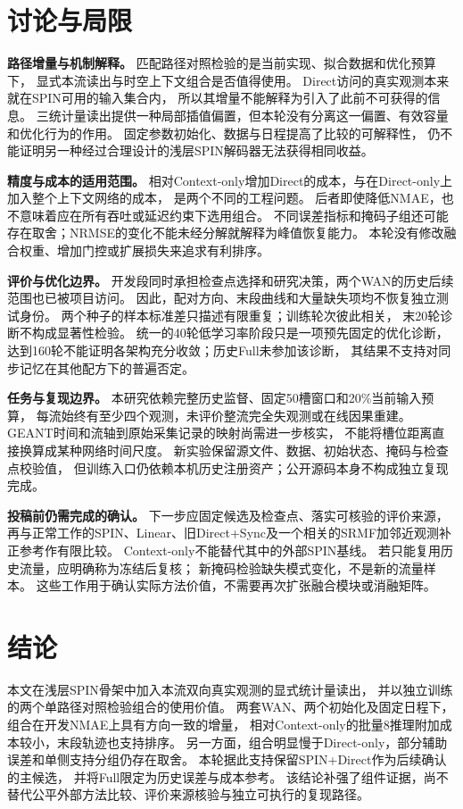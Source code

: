 \section{讨论与局限}
\label{sec:limitations}
\textbf{路径增量与机制解释。}
匹配路径对照检验的是当前实现、拟合数据和优化预算下，
显式本流读出与时空上下文组合是否值得使用。
Direct访问的真实观测本来就在SPIN可用的输入集合内，
所以其增量不能解释为引入了此前不可获得的信息。
三统计量读出提供一种局部插值偏置，但本轮没有分离这一偏置、有效容量和优化行为的作用。
固定参数初始化、数据与日程提高了比较的可解释性，
仍不能证明另一种经过合理设计的浅层SPIN解码器无法获得相同收益。

\textbf{精度与成本的适用范围。}
相对Context-only增加Direct的成本，与在Direct-only上加入整个上下文网络的成本，
是两个不同的工程问题。
后者即使降低NMAE，也不意味着应在所有吞吐或延迟约束下选用组合。
不同误差指标和掩码子组还可能存在取舍；NRMSE的变化不能未经分解就解释为峰值恢复能力。
本轮没有修改融合权重、增加门控或扩展损失来追求有利排序。

\textbf{评价与优化边界。}
开发段同时承担检查点选择和研究决策，两个WAN的历史后续范围也已被项目访问。
因此，配对方向、末段曲线和大量缺失项均不恢复独立测试身份。
两个种子的样本标准差只描述有限重复；训练轮次彼此相关，
末20轮诊断不构成显著性检验。
统一的40轮低学习率阶段只是一项预先固定的优化诊断，
达到160轮不能证明各架构充分收敛；历史Full未参加该诊断，
其结果不支持对同步记忆在其他配方下的普遍否定。

\textbf{任务与复现边界。}
本研究依赖完整历史监督、固定50槽窗口和20\%当前输入预算，
每流始终有至少四个观测，未评价整流完全失观测或在线因果重建。
GEANT时间和流轴到原始采集记录的映射尚需进一步核实，
不能将槽位距离直接换算成某种网络时间尺度。
新实验保留源文件、数据、初始状态、掩码与检查点校验值，
但训练入口仍依赖本机历史注册资产；公开源码本身不构成独立复现完成。

\textbf{投稿前仍需完成的确认。}
下一步应固定候选及检查点、落实可核验的评价来源，
再与正常工作的SPIN、Linear、旧Direct+Sync及一个相关的SRMF加邻近观测补正参考作有限比较。
Context-only不能替代其中的外部SPIN基线。
若只能复用历史流量，应明确称为冻结后复核；
新掩码检验缺失模式变化，不是新的流量样本。
这些工作用于确认实际方法价值，不需要再次扩张融合模块或消融矩阵。

\section{结论}
本文在浅层SPIN骨架中加入本流双向真实观测的显式统计量读出，
并以独立训练的两个单路径对照检验组合的使用价值。
两套WAN、两个初始化及固定日程下，组合在开发NMAE上具有方向一致的增量，
相对Context-only的批量8推理附加成本较小，末段轨迹也支持排序。
另一方面，组合明显慢于Direct-only，部分辅助误差和单侧支持分组仍存在取舍。
本轮据此支持保留SPIN+Direct作为后续确认的主候选，
并将Full限定为历史误差与成本参考。
该结论补强了组件证据，尚不替代公平外部方法比较、评价来源核验与独立可执行的复现路径。
